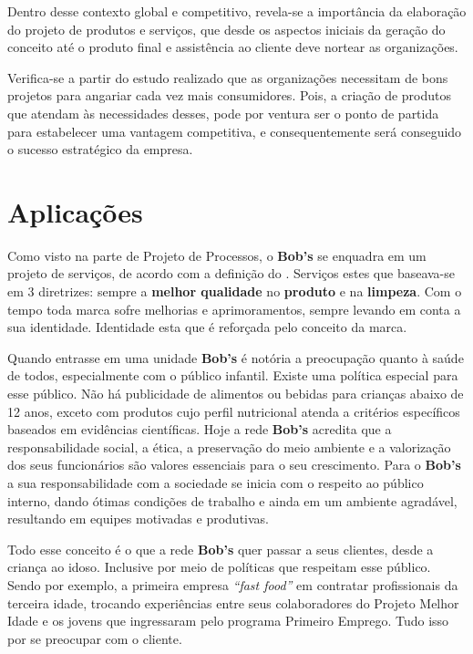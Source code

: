             Dentro desse contexto global e competitivo, revela-se a importância da elaboração do projeto de produtos e serviços, que desde os aspectos iniciais da geração do conceito até o produto final e assistência ao cliente deve nortear as organizações. 


    	Verifica-se a partir do estudo realizado que as organizações necessitam de bons projetos para angariar cada vez mais consumidores. Pois, a criação de produtos que atendam às necessidades desses, pode por ventura ser o ponto de partida para estabelecer uma vantagem competitiva, e consequentemente será conseguido o sucesso estratégico da empresa.

	\section[Aplicações]{Aplicações}
	\label{sec:produtos_aplicacoes}

		Como visto na parte de Projeto de Processos, o \textbf{Bob’s} se enquadra em um projeto de serviços, de acordo com a definição do \cite{slack}. Serviços estes que baseava-se em 3 diretrizes: sempre a \textbf{melhor qualidade} no \textbf{produto} e na \textbf{limpeza}. Com o tempo toda marca sofre melhorias e aprimoramentos, sempre levando em conta a sua identidade. Identidade esta que é reforçada pelo conceito da marca. 

		Quando entrasse em uma unidade \textbf{Bob’s} é notória a preocupação quanto à saúde de todos, especialmente com o público infantil. Existe uma política especial para esse público. Não há publicidade de alimentos ou bebidas para crianças abaixo de 12 anos, exceto com produtos cujo perfil nutricional atenda a critérios específicos baseados em evidências científicas. Hoje a rede \textbf{Bob’s} acredita que a responsabilidade social, a ética, a preservação do meio ambiente e a valorização dos seus funcionários são valores essenciais para o seu crescimento. Para o \textbf{Bob’s} a sua responsabilidade com a sociedade se inicia com o respeito ao público interno, dando ótimas condições de trabalho e ainda em um ambiente agradável, resultando em equipes motivadas e produtivas.

		Todo esse conceito é o que a rede \textbf{Bob’s} quer passar a seus clientes, desde a criança ao idoso. Inclusive por meio de políticas que respeitam esse público. Sendo por exemplo, a primeira empresa \emph{“fast food”} em contratar profissionais da terceira idade, trocando experiências entre seus colaboradores do Projeto Melhor Idade e os jovens que ingressaram pelo programa Primeiro Emprego. Tudo isso por se preocupar com o cliente.

